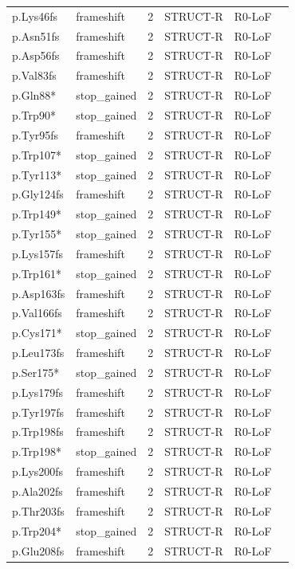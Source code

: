 \begin{footnotesize}
\begin{longtable}{llllll}
p.Lys46fs & frameshift & 2 & STRUCT-R & R0-LoF & \\
p.Asn51fs & frameshift & 2 & STRUCT-R & R0-LoF & \\
p.Asp56fs & frameshift & 2 & STRUCT-R & R0-LoF & \\
p.Val83fs & frameshift & 2 & STRUCT-R & R0-LoF & \\
p.Gln88* & stop\_gained & 2 & STRUCT-R & R0-LoF & \\
p.Trp90* & stop\_gained & 2 & STRUCT-R & R0-LoF & \\
p.Tyr95fs & frameshift & 2 & STRUCT-R & R0-LoF & \\
p.Trp107* & stop\_gained & 2 & STRUCT-R & R0-LoF & \\
p.Tyr113* & stop\_gained & 2 & STRUCT-R & R0-LoF & \\
p.Gly124fs & frameshift & 2 & STRUCT-R & R0-LoF & \\
p.Trp149* & stop\_gained & 2 & STRUCT-R & R0-LoF & \\
p.Tyr155* & stop\_gained & 2 & STRUCT-R & R0-LoF & \\
p.Lys157fs & frameshift & 2 & STRUCT-R & R0-LoF & \\
p.Trp161* & stop\_gained & 2 & STRUCT-R & R0-LoF & \\
p.Asp163fs & frameshift & 2 & STRUCT-R & R0-LoF & \\
p.Val166fs & frameshift & 2 & STRUCT-R & R0-LoF & \\
p.Cys171* & stop\_gained & 2 & STRUCT-R & R0-LoF & \\
p.Leu173fs & frameshift & 2 & STRUCT-R & R0-LoF & \\
p.Ser175* & stop\_gained & 2 & STRUCT-R & R0-LoF & \\
p.Lys179fs & frameshift & 2 & STRUCT-R & R0-LoF & \\
p.Tyr197fs & frameshift & 2 & STRUCT-R & R0-LoF & \\
p.Trp198fs & frameshift & 2 & STRUCT-R & R0-LoF & \\
p.Trp198* & stop\_gained & 2 & STRUCT-R & R0-LoF & \\
p.Lys200fs & frameshift & 2 & STRUCT-R & R0-LoF & \\
p.Ala202fs & frameshift & 2 & STRUCT-R & R0-LoF & \\
p.Thr203fs & frameshift & 2 & STRUCT-R & R0-LoF & \\
p.Trp204* & stop\_gained & 2 & STRUCT-R & R0-LoF & \\
p.Glu208fs & frameshift & 2 & STRUCT-R & R0-LoF & \\

\end{longtable}
\end{footnotesize}
